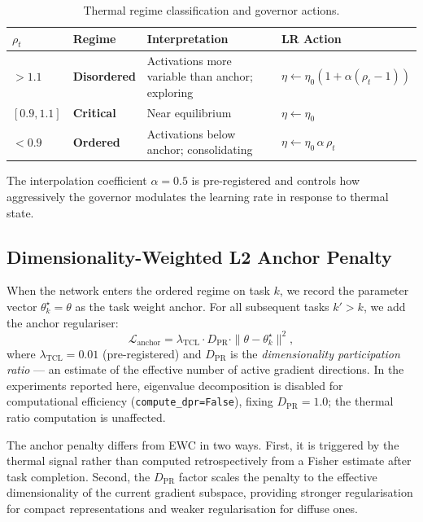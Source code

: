 \documentclass[10pt,a4paper]{article}
\begin{document}
\begin{table}[h]
\centering
\caption{Thermal regime classification and governor actions.}
\label{tab:regimes}
\begin{tabular}{llll}
\toprule
$\rho_t$ & Regime & Interpretation & LR Action \\
\midrule
$> 1.1$ & \textbf{Disordered} & Activations more variable than anchor; exploring &
    $\eta \leftarrow \eta_0\!\left(1 + \alpha(\rho_t - 1)\right)$ \\
$[0.9, 1.1]$ & \textbf{Critical} & Near equilibrium & $\eta \leftarrow \eta_0$ \\
$< 0.9$ & \textbf{Ordered} & Activations below anchor; consolidating &
    $\eta \leftarrow \eta_0\,\alpha\,\rho_t$ \\
\bottomrule
\end{tabular}
\end{table}

The interpolation coefficient $\alpha = 0.5$ is pre-registered and controls how
aggressively the governor modulates the learning rate in response to thermal state.

\subsection{Dimensionality-Weighted L2 Anchor Penalty}

When the network enters the ordered regime on task $k$, we record the parameter
vector $\theta^\star_k = \theta$ as the task weight anchor.
For all subsequent tasks $k' > k$, we add the anchor regulariser:
\begin{equation}
    \mathcal{L}_{\text{anchor}} = \lambda_{\text{TCL}} \cdot D_{\mathrm{PR}} \cdot
        \|\theta - \theta^\star_k\|^2,
    \label{eq:penalty}
\end{equation}
where $\lambda_{\text{TCL}} = 0.01$ (pre-registered) and $D_{\mathrm{PR}}$ is the
\emph{dimensionality participation ratio} --- an estimate of the effective number of
active gradient directions.
In the experiments reported here, eigenvalue decomposition is disabled for
computational efficiency (\texttt{compute\_dpr=False}), fixing $D_{\mathrm{PR}} = 1.0$;
the thermal ratio computation is unaffected.

The anchor penalty differs from EWC in two ways.
First, it is triggered by the thermal signal rather than computed retrospectively from
a Fisher estimate after task completion.
Second, the $D_{\mathrm{PR}}$ factor scales the penalty to the effective dimensionality
of the current gradient subspace, providing stronger regularisation for compact
representations and weaker regularisation for diffuse ones.
\end{document}
